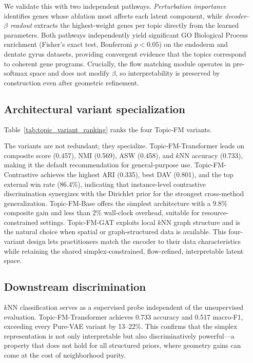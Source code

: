 \documentclass[biology,article,submit,pdftex,moreauthors]{Definitions/mdpi}
\begin{document}
We validate this with two independent pathways. \emph{Perturbation importance} identifies genes whose ablation most affects each latent component, while \emph{decoder-$\beta$ readout} extracts the highest-weight genes per topic directly from the learned parameters. Both pathways independently yield significant GO Biological Process enrichment (Fisher's exact test, Bonferroni $p < 0.05$) on the endoderm and dentate gyrus datasets, providing convergent evidence that the topics correspond to coherent gene programs. Crucially, the flow matching module operates in pre-softmax space and does not modify $\beta$, so interpretability is preserved by construction even after geometric refinement.

\subsection{Architectural variant specialization}
Table~\ref{tab:topic_variant_ranking} ranks the four Topic-FM variants.



The variants are not redundant; they specialize. Topic-FM-Transformer leads on composite score (0.457), NMI (0.569), ASW (0.458), and $k$NN accuracy (0.733), making it the default recommendation for general-purpose use. Topic-FM-Contrastive achieves the highest ARI (0.335), best DAV (0.801), and the top external win rate (86.4\%), indicating that instance-level contrastive discrimination synergizes with the Dirichlet prior for the strongest cross-method generalization. Topic-FM-Base offers the simplest architecture with a 9.8\% composite gain and less than 2\% wall-clock overhead, suitable for resource-constrained settings. Topic-FM-GAT exploits local $k$NN graph structure and is the natural choice when spatial or graph-structured data is available. This four-variant design lets practitioners match the encoder to their data characteristics while retaining the shared simplex-constrained, flow-refined, interpretable latent space.

\subsection{Downstream discrimination}
$k$NN classification serves as a supervised probe independent of the unsupervised evaluation. Topic-FM-Transformer achieves 0.733 accuracy and 0.517 macro-F1, exceeding every Pure-VAE variant by 13--22\%. This confirms that the simplex representation is not only interpretable but also discriminatively powerful---a property that does not hold for all structured priors, where geometry gains can come at the cost of neighborhood purity.
\end{document}
